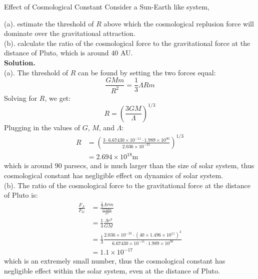\bigskip \noindent %
\begin{example}{Effect of Cosmological Constant}{}
    Consider a Sun-Earth like system, 

    (a). estimate the threshold of $R$ above which the cosmological replusion force will dominate over the gravitational attraction. \\
    (b). calculate the ratio of the cosmological force to the gravitational force at the distance of Pluto, which is around $40$ AU. \\

    \bigskip\textbf{Solution.}\quad \\
    (a). The threshold of $R$ can be found by setting the two forces equal:
    \[
        \frac{GM m}{R^2} = \frac{1}{3}\Lambda R m
    \]
    Solving for $R$, we get:
    \[
        R = \left( \frac{3GM}{\Lambda} \right)^{1/3}
    \]
    Plugging in the values of $G$, $M$, and $\Lambda$:
    \begin{align*}
        R &= \left( \frac{3 \cdot 6.67430 \times 10^{-11} \cdot 1.989 \times 10^{30}}{2.036 \times 10^{-35}} \right)^{1/3} \\
        &= 2.694 \times 10^{18} \mathrm{m} 
    \end{align*}
    which is around $90$ parsecs, and is much larger than the size of solar system, thus cosmological constant has negligible effect on dynamics of solar system. \\

    (b). The ratio of the cosmological force to the gravitational force at the distance of Pluto is:
    \begin{align*}
       \frac{F_\Lambda}{F_G} &= \frac{\frac{1}{3}\Lambda r m}{\frac{GM m}{r^2}} \\
         &= \frac{1}{3} \frac{\Lambda r^3}{GM} \\
         &= \frac{1}{3} \frac{2.036 \times 10^{-35} \cdot (40 \times 1.496 \times 10^{11})^3}{6.67430 \times 10^{-11} \cdot 1.989 \times 10^{30}} \\
         &= 1.1 \times 10^{-17}
    \end{align*}
    which is an extremely small number, thus the cosmological constant has negligible effect within the solar system, even at the distance of Pluto. \\
\end{example}




\bigskip \noindent \bigskip \noindent \bigskip \noindent
\bigskip \noindent \bigskip \noindent \bigskip \noindent \bigskip \noindent
\bigskip \noindent \bigskip \noindent \bigskip \noindent \bigskip \noindent
